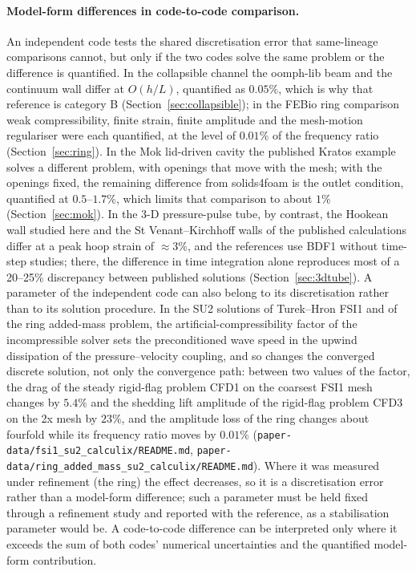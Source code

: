 \paragraph{Model-form differences in code-to-code comparison.}
An independent code tests the shared discretisation error that same-lineage comparisons cannot, but only if the two codes solve the same problem or the difference is quantified.
In the collapsible channel the oomph-lib beam and the continuum wall differ at $O(h/L)$, quantified as $0.05\%$, which is why that reference is category B (Section~\ref{sec:collapsible}); in the FEBio ring comparison weak compressibility, finite strain, finite amplitude and the mesh-motion regulariser were each quantified, at the level of $0.01\%$ of the frequency ratio (Section~\ref{sec:ring}).
In the Mok lid-driven cavity the published Kratos example solves a different problem, with openings that move with the mesh; with the openings fixed, the remaining difference from solids4foam is the outlet condition, quantified at $0.5$--$1.7\%$, which limits that comparison to about $1\%$ (Section~\ref{sec:mok}).
In the 3-D pressure-pulse tube, by contrast, the Hookean wall studied here and the St Venant--Kirchhoff walls of the published calculations differ at a peak hoop strain of $\approx3\%$, and the references use BDF1 without time-step studies; there, the difference in time integration alone reproduces most of a 20--25\% discrepancy between published solutions (Section~\ref{sec:3dtube}).
A parameter of the independent code can also belong to its discretisation rather than to its solution procedure.
In the SU2 solutions of Turek--Hron FSI1 and of the ring added-mass problem, the artificial-compressibility factor of the incompressible solver sets the preconditioned wave speed in the upwind dissipation of the pressure--velocity coupling, and so changes the converged discrete solution, not only the convergence path: between two values of the factor, the drag of the steady rigid-flag problem CFD1 on the coarsest FSI1 mesh changes by $5.4\%$ and the shedding lift amplitude of the rigid-flag problem CFD3 on the 2x mesh by $23\%$, and the amplitude loss of the ring changes about fourfold while its frequency ratio moves by $0.01\%$ (\texttt{paper-data/fsi1\_su2\_calculix/README.md}, \texttt{paper-data/ring\_added\_mass\_su2\_calculix/README.md}).
Where it was measured under refinement (the ring) the effect decreases, so it is a discretisation error rather than a model-form difference; such a parameter must be held fixed through a refinement study and reported with the reference, as a stabilisation parameter would be.
A code-to-code difference can be interpreted only where it exceeds the sum of both codes' numerical uncertainties and the quantified model-form contribution.

